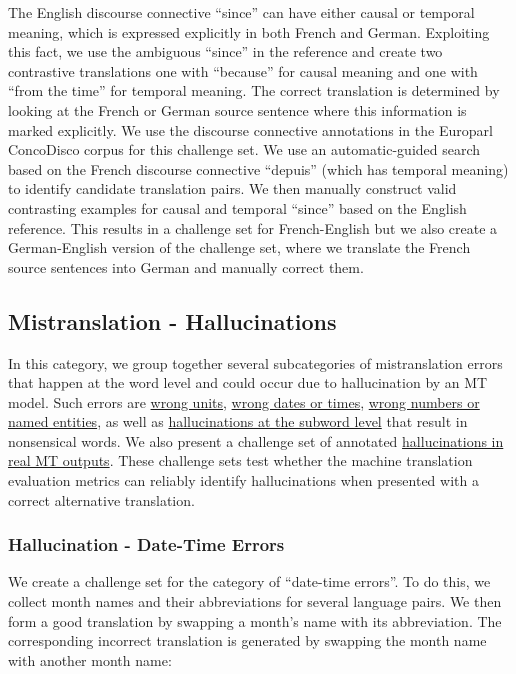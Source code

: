 \documentclass[11pt]{article}
\begin{document}
The English discourse connective ``since'' can have either causal or temporal meaning, which is expressed explicitly in both French and German. Exploiting this fact, we use the ambiguous ``since'' in the reference and create two contrastive translations one with ``because'' for causal meaning and one with ``from the time'' for temporal meaning. The correct translation is determined by looking at the French or German source sentence where this information is marked explicitly. We use the discourse connective annotations in the Europarl ConcoDisco corpus for this challenge set. We use an automatic-guided search based on the French discourse connective ``depuis'' (which has temporal meaning) to identify candidate translation pairs. We then manually construct valid contrasting examples for causal and temporal ``since'' based on the English reference. This results in a challenge set for French-English but we also create a German-English version of the challenge set, where we translate the French source sentences into German and manually correct them.


\subsection{Mistranslation - Hallucinations}
\label{sec:hallucination}
In this category, we group together several subcategories of mistranslation errors that happen at the word level and could occur due to hallucination by an MT model. Such errors are \hyperref[subsec:units]{wrong units}, \hyperref[subsec:date-time]{wrong dates or times}, \hyperref[subsec:levels]{wrong numbers or named entities}, as well as \hyperref[sec:nonsense]{hallucinations at the subword level} that result in nonsensical words. We also present a challenge set of annotated \hyperref[subsec:real_hallucination]{hallucinations in real MT outputs}. These challenge sets test whether the machine translation evaluation metrics can reliably identify hallucinations when presented with a correct alternative translation.


\subsubsection{Hallucination - Date-Time Errors}
\label{subsec:date-time}
We create a challenge set for the category of ``date-time errors''. To do this, we collect month names and their abbreviations for several language pairs. We then form a good translation by swapping a month's name with its abbreviation. The corresponding incorrect translation is generated by swapping the month name with another month name:
\end{document}
